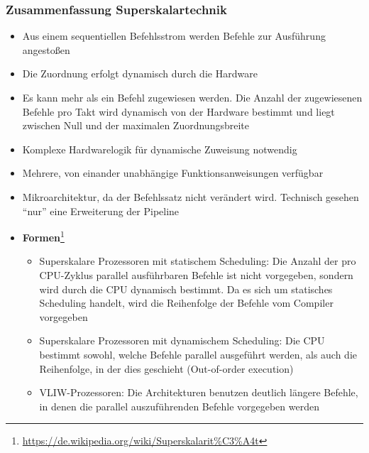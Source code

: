 \subsubsection{Zusammenfassung Superskalartechnik}
\begin{itemize}
	\item Aus einem sequentiellen Befehlsstrom werden Befehle zur Ausführung angestoßen
	\item Die Zuordnung erfolgt dynamisch durch die Hardware
	\item Es kann mehr als ein Befehl zugewiesen werden. Die Anzahl der zugewiesenen Befehle pro Takt wird dynamisch von der Hardware bestimmt und liegt zwischen Null und der maximalen Zuordnungsbreite
	\item Komplexe Hardwarelogik für dynamische Zuweisung notwendig
	\item Mehrere, von einander unabhängige Funktionsanweisungen verfügbar
	\item Mikroarchitektur, da der Befehlssatz nicht verändert wird. Technisch gesehen "`nur"' eine Erweiterung der Pipeline
	\item \textbf{Formen}\footnote{\url{https://de.wikipedia.org/wiki/Superskalarit\%C3\%A4t}}
	\begin{itemize}
		\item Superskalare Prozessoren mit statischem Scheduling: Die Anzahl der pro CPU-Zyklus parallel ausführbaren Befehle ist nicht vorgegeben, sondern wird durch die CPU dynamisch bestimmt. Da es sich um statisches Scheduling handelt, wird die Reihenfolge der Befehle vom Compiler vorgegeben
		\item Superskalare Prozessoren mit dynamischem Scheduling: Die CPU bestimmt sowohl, welche Befehle parallel ausgeführt werden, als auch die Reihenfolge, in der dies geschieht (Out-of-order execution)
		\item VLIW-Prozessoren: Die Architekturen benutzen deutlich längere Befehle, in denen die parallel auszuführenden Befehle vorgegeben werden
	\end{itemize}
\end{itemize}


